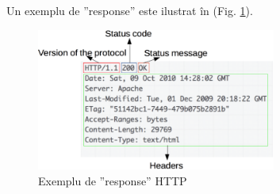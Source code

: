 Un exemplu de ”response” este ilustrat în (Fig. \ref{fig:25}).

\begin{figure}[!htb]
	\centering
	\includegraphics[width=0.7\textwidth]
	{../LaTeX/Images/http_response-ex.PNG}
	\caption{Exemplu de ”response” HTTP}
	\label{fig:25}
\end{figure}


